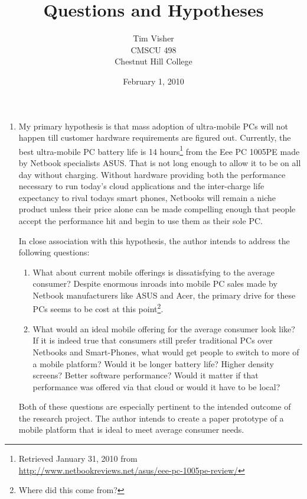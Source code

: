\documentclass[12pt,oneside,letterpaper]{article}
\author{Tim Visher\\ CMSCU 498\\ Chestnut Hill College}
\title{Questions and Hypotheses}
\date{February 1, 2010}
\begin{document}
\maketitle

\begin{enumerate}

\item My primary hypothesis is that mass adoption of ultra-mobile PCs will not
  happen till customer hardware requirements are figured out.  Currently, the
  best ultra-mobile PC battery life is 14 hours\footnote{Retrieved January 31,
    2010 from\\ \url{http://www.netbookreviews.net/asus/eee-pc-1005pe-review/}}
  from the Eee PC 1005PE made by Netbook specialists ASUS.  That is not long
  enough to allow it to be on all day without charging.  Without hardware
  providing both the performance necessary to run today's cloud applications and
  the inter-charge life expectancy to rival todays smart phones, Netbooks will
  remain a niche product unless their price alone can be made compelling enough
  that people accept the performance hit and begin to use them as their sole PC.

  In close association with this hypothesis, the author intends to address the
  following questions:

  \begin{enumerate}

  \item What about current mobile offerings is dissatisfying to the average
    consumer?  Despite enormous inroads into mobile PC sales made by Netbook
    manufacturers like ASUS and Acer, the primary drive for these PCs seems to
    be cost at this point\footnote{Where did this come from?}. %

  \item What would an ideal mobile offering for the average consumer look like?
    If it is indeed true that consumers still prefer traditional PCs over
    Netbooks and Smart-Phones, what would get people to switch to more of a
    mobile platform?  Would it be longer battery life?  Higher density screens?
    Better software performance?  Would it matter if that performance was
    offered via that cloud or would it have to be local?

  \end{enumerate}

  Both of these questions are especially pertinent to the intended outcome of
  the research project.  The author intends to create a paper prototype of a
  mobile platform that is ideal to meet average consumer needs.


\end{enumerate}
\end{document}
